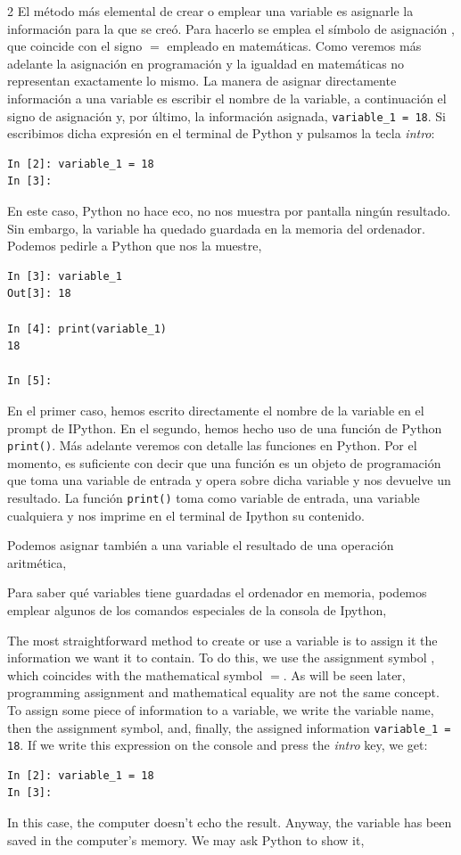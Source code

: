 \begin{paracol}{2}
\switchcolumn
El método más elemental de crear o emplear una variable es asignarle la información para la que se creó. Para hacerlo se emplea el símbolo de asignación  , que coincide con el signo $=$ empleado en matemáticas. Como veremos más adelante la asignación en programación y la igualdad en matemáticas no representan exactamente lo mismo. La manera de asignar directamente información a una variable es escribir el nombre de la variable, a continuación  el signo de asignación y, por último, la información asignada, \texttt{variable_1 = 18}. Si escribimos dicha expresión en el terminal de Py\-thon y pulsamos la tecla \emph{intro}:
\begin{verbatim}
In [2]: variable_1 = 18
In [3]:
\end{verbatim}
En este caso, Python no hace eco, no nos muestra por pantalla ningún resultado. Sin embargo, la variable ha quedado guardada en la memoria del ordenador. Podemos pedirle a Python que nos la muestre, 
\begin{verbatim}
In [3]: variable_1
Out[3]: 18

In [4]: print(variable_1)
18

In [5]: 
\end{verbatim}
En el primer caso, hemos escrito directamente el nombre de la variable en el prompt de IPython. En el segundo, hemos hecho uso de una función de Python \texttt{print()}. Más adelante veremos con detalle las funciones en Python. Por el momento, es suficiente con decir que una función es un objeto de programación que toma una variable de entrada y opera sobre dicha variable y nos devuelve un resultado. La  función \texttt{print()} toma como variable de entrada, una variable cualquiera y nos imprime en el terminal de Ipython su contenido.

Podemos asignar también a una variable el resultado de una operación aritmética,

Para saber qué variables tiene guardadas el ordenador en memoria, podemos emplear algunos de los comandos especiales de la consola de Ipython,

\switchcolumn
The most straightforward method to create or use a variable is to assign it the information we want it to contain. To do this, we use the assignment symbol  , which coincides with the mathematical symbol $=$. As will be seen later, programming assignment and mathematical equality are not the same concept. To assign some piece of information to a variable, we write the variable name, then the assignment symbol, and, finally, the assigned information \texttt{variable_1 = 18}. If we write this expression on the console and press the \emph{intro} key, we get:
\begin{verbatim}
In [2]: variable_1 = 18
In [3]:
\end{verbatim}
In this case, the computer doesn't echo the result. Anyway,  the variable has been saved in the computer's memory. We may ask Python to show it,


\end{paracol}
